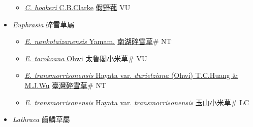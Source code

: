 \begin{itemize}
  \begin{itemize}
        \item[] \href{http://www.theplantlist.org/tpl1.1/search?q=Christisonia+hookeri}{\textit{C. hookeri} C.B.Clarke}   \href{\detokenize{http://taibnet.sinica.edu.tw/chi/taibnet_species_list.php?T2=假野菰&T2_new_value=true&fr=y}}{假野菰} VU
  \end{itemize}
 \item[] \textit{Euphrasia} 碎雪草屬
                    
  \begin{itemize}
        \item[] \href{http://www.theplantlist.org/tpl1.1/search?q=Euphrasia+nankotaizanensis}{\textit{E. nankotaizanensis} Yamam.}   \href{\detokenize{http://taibnet.sinica.edu.tw/chi/taibnet_species_list.php?T2=南湖碎雪草&T2_new_value=true&fr=y}}{南湖碎雪草}\# NT
        \item[] \href{http://www.theplantlist.org/tpl1.1/search?q=Euphrasia+tarokoana}{\textit{E. tarokoana} Ohwi}   \href{\detokenize{http://taibnet.sinica.edu.tw/chi/taibnet_species_list.php?T2=太魯閣小米草&T2_new_value=true&fr=y}}{太魯閣小米草}\# VU
        \item[] \href{http://www.theplantlist.org/tpl1.1/search?q=Euphrasia+transmorrisonensis+var.+durietziana}{\textit{E. transmorrisonensis} Hayata var. \textit{durietziana} (Ohwi) T.C.Huang \& M.J.Wu}   \href{\detokenize{http://taibnet.sinica.edu.tw/chi/taibnet_species_list.php?T2=臺灣碎雪草&T2_new_value=true&fr=y}}{臺灣碎雪草}\# NT
        \item[] \href{http://www.theplantlist.org/tpl1.1/search?q=Euphrasia+transmorrisonensis+var.+transmorrisonensis}{\textit{E. transmorrisonensis} Hayata var. \textit{transmorrisonensis}}   \href{\detokenize{http://taibnet.sinica.edu.tw/chi/taibnet_species_list.php?T2=玉山小米草&T2_new_value=true&fr=y}}{玉山小米草}\# LC
  \end{itemize}
 \item[] \textit{Lathraea} 齒鱗草屬
                    

\end{itemize}
